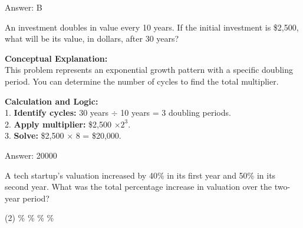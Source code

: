 \documentclass[11pt,paper=a4,answers]{exam}
\begin{document}
\begin{questions}
\begin{solution}
\vspace{30pt}

Answer: \colorbox{yellow!100}{B}
\end{solution}

\vspace{60pt}

\question
An investment doubles in value every 10 years. If the initial investment is \$2,500, what will be its value, in dollars, after 30 years?

\begin{solution}
\textbf{Conceptual Explanation:} \\
This problem represents an exponential growth pattern with a specific doubling period. You can determine the number of cycles to find the total multiplier.

\vspace{30pt}
\begin{center}
\end{center}
\vspace{30pt}

\textbf{Calculation and Logic:} \\
1. \textbf{Identify cycles:} 30 years $\div$ 10 years = 3 doubling periods. \\
2. \textbf{Apply multiplier:} \$2,500 $\times 2^3$. \\
3. \textbf{Solve:} \$2,500 $\times$ 8 = \$20,000.

\vspace{30pt}

Answer: \colorbox{yellow!100}{20000}
\end{solution}

\vspace{60pt}

\question
A tech startup's valuation increased by 40\% in its first year and 50\% in its second year. What was the total percentage increase in valuation over the two-year period?
\begin{tasks}(2)
    \%
    \%
    \%
    \%
\end{tasks}


\end{questions}
\end{document}
